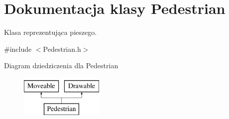 \hypertarget{class_pedestrian}{\section{Dokumentacja klasy Pedestrian}
\label{class_pedestrian}
}


Klasa reprezentująca pieszego.  




{\ttfamily \#include $<$Pedestrian.\-h$>$}

Diagram dziedziczenia dla Pedestrian\begin{figure}[H]
\begin{center}
\leavevmode
\includegraphics[height=2.000000cm]{class_pedestrian}
\end{center}
\end{figure}

